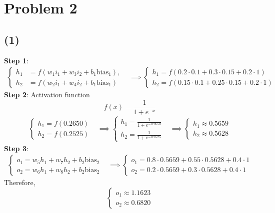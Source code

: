 \documentclass[onecolumn,oneside]{SUSTechHomework}
\begin{document}
    \section{Problem 2}
    \subsection*{(1)}
    \textbf{Step 1}: 
    \[
    \begin{aligned}
        \begin{cases}
            h_1 &= f(w_1 i_1 + w_3 i_2 + b_1 \text{bias}_1), \\
            h_2 &= f(w_2 i_1 + w_4 i_2 + b_1 \text{bias}_1)
        \end{cases}
        &\implies
        \begin{cases}
            h_1 = f(0.2 \cdot 0.1 + 0.3 \cdot 0.15 + 0.2 \cdot 1)\\
            h_2 = f(0.15 \cdot 0.1 + 0.25 \cdot 0.15 + 0.2 \cdot 1)
        \end{cases}
    \end{aligned}
    \]
    \textbf{Step 2}: Activation function
    \[f(x) = \frac{1}{1 + e^{-x}}\]
    \[
    \begin{aligned}
        \begin{cases}
        h_1 = f(0.2650) \\
        h_2 = f(0.2525)
        \end{cases}
        &\implies
        \begin{cases}
        h_1 = \frac{1}{1 + e^{-0.2650}} \\
        h_2 = \frac{1}{1 + e^{-0.2525}}
        \end{cases}
        &\implies
        \begin{cases}
        h_1 \approx 0.5659 \\
        h_2 \approx 0.5628
        \end{cases}
    \end{aligned}
    \]
    \textbf{Step 3}:
    \[
    \begin{aligned}
        \begin{cases}
        o_1 = w_5 h_1 + w_7 h_2 + b_2 \text{bias}_2 \\
        o_2 = w_6 h_1 + w_8 h_2 + b_2 \text{bias}_2
        \end{cases}
        &\implies
        \begin{cases}
        o_1 = 0.8 \cdot 0.5659 + 0.55 \cdot 0.5628 + 0.4 \cdot 1 \\
        o_2 = 0.2 \cdot 0.5659 + 0.3 \cdot 0.5628 + 0.4 \cdot 1
        \end{cases}
    \end{aligned}
    \]
    Therefore, 
    \[
    \begin{cases}
        o_1 \approx 1.1623 \\
        o_2 \approx 0.6820
    \end{cases}
    \]
\end{document}
